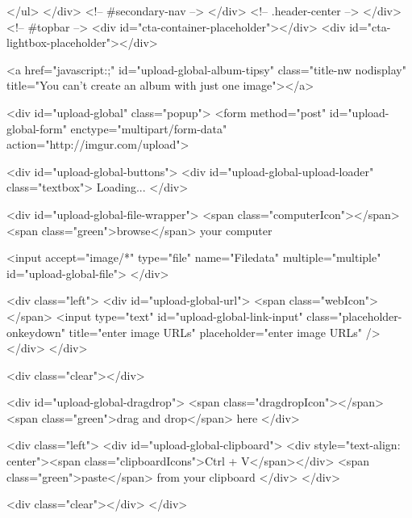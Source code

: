             </ul>
        </div> <!-- #secondary-nav -->
    </div> <!-- .header-center -->
</div> <!-- #topbar -->
<div id="cta-container-placeholder"></div>
<div id="cta-lightbox-placeholder"></div>



        
    

    

            

        
    

            <a href="javascript:;" id="upload-global-album-tipsy" class="title-nw nodisplay" title="You can't create an album with just one image"></a>

<div id="upload-global" class="popup">
    <form method="post" id="upload-global-form" enctype="multipart/form-data" action="http://imgur.com/upload">
        

        <div id="upload-global-buttons">
            <div id="upload-global-upload-loader" class="textbox">
                Loading...
            </div>

            <div id="upload-global-file-wrapper">
                <span class="computerIcon"></span>
                <span class="green">browse</span> your computer

                <input accept="image/*" type="file" name="Filedata" multiple="multiple" id="upload-global-file">
            </div>

            <div class="left">
                <div id="upload-global-url">
                    <span class="webIcon"></span>
                    <input type="text" id="upload-global-link-input" class="placeholder-onkeydown" title="enter image URLs" placeholder="enter image URLs" />
                </div>
            </div>

            <div class="clear"></div>

            <div id="upload-global-dragdrop">
                <span class="dragdropIcon"></span>
                <span class="green">drag and drop</span> here
            </div>

            <div class="left">
                <div id="upload-global-clipboard">
                    <div style="text-align: center"><span class="clipboardIcons">Ctrl + V</span></div>
                    <span class="green">paste</span> from your clipboard
                </div>
            </div>

            <div class="clear"></div>
        </div>

